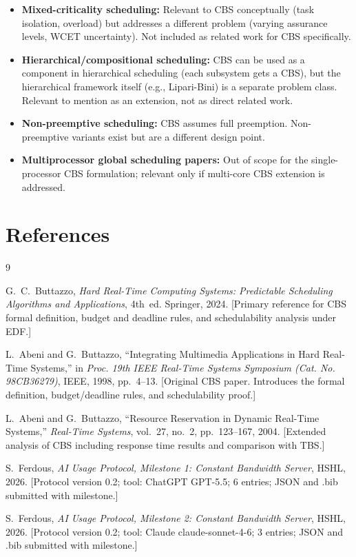 \documentclass[conference]{IEEEtran}
\begin{document}
\begin{itemize}
  \item \textbf{Mixed-criticality scheduling:} Relevant to CBS
        conceptually (task isolation, overload) but addresses a
        different problem (varying assurance levels, WCET uncertainty).
        Not included as related work for CBS specifically.
  \item \textbf{Hierarchical/compositional scheduling:} CBS can be
        used as a component in hierarchical scheduling (each subsystem
        gets a CBS), but the hierarchical framework itself (e.g.,
        Lipari-Bini) is a separate problem class. Relevant to mention
        as an extension, not as direct related work.
  \item \textbf{Non-preemptive scheduling:} CBS assumes full
        preemption. Non-preemptive variants exist but are a different
        design point.
  \item \textbf{Multiprocessor global scheduling papers:} Out of scope
        for the single-processor CBS formulation; relevant only if
        multi-core CBS extension is addressed.
\end{itemize}


\section*{References}

\begin{thebibliography}{9}

G.~C.~Buttazzo,
\textit{Hard Real-Time Computing Systems: Predictable Scheduling Algorithms
and Applications}, 4th~ed.
Springer, 2024.
[Primary reference for CBS formal definition, budget and deadline
rules, and schedulability analysis under EDF.]

L.~Abeni and G.~Buttazzo,
``Integrating Multimedia Applications in Hard Real-Time Systems,''
in \textit{Proc. 19th IEEE Real-Time Systems Symposium
(Cat. No. 98CB36279)}, IEEE, 1998, pp.~4--13.
[Original CBS paper. Introduces the formal definition, budget/deadline
rules, and schedulability proof.]

L.~Abeni and G.~Buttazzo,
``Resource Reservation in Dynamic Real-Time Systems,''
\textit{Real-Time Systems}, vol.~27, no.~2, pp.~123--167, 2004.
[Extended analysis of CBS including response time results and
comparison with TBS.]

S.~Ferdous,
\textit{AI Usage Protocol, Milestone 1: Constant Bandwidth Server},
HSHL, 2026.
[Protocol version 0.2; tool: ChatGPT GPT-5.5; 6 entries; JSON and
.bib submitted with milestone.]

S.~Ferdous,
\textit{AI Usage Protocol, Milestone 2: Constant Bandwidth Server},
HSHL, 2026.
[Protocol version 0.2; tool: Claude claude-sonnet-4-6; 3 entries; JSON and
.bib submitted with milestone.]

\end{thebibliography}
\end{document}
